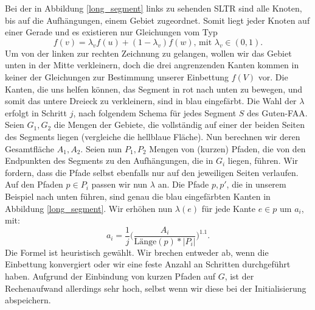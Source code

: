 \begin{example}\label{bsp_long_segment}
Bei der in Abbildung \ref{long_segment} links zu sehenden SLTR sind alle Knoten, bis auf die Aufhängungen, einem Gebiet zugeordnet. Somit liegt jeder Knoten auf einer Gerade und es existieren nur Gleichungen vom Typ
$$ f(v) = \lambda_v f(u) + (1-\lambda_v)f(w) \text{, mit } \lambda_v \in (0,1).$$
Um von der linken zur rechten Zeichnung zu gelangen, wollen wir das Gebiet unten in der Mitte verkleinern, doch die drei angrenzenden Kanten kommen in keiner der Gleichungen zur Bestimmung unserer Einbettung $f(V)$ vor. Die Kanten, die uns helfen können, das Segment in rot nach unten zu bewegen, und somit das untere Dreieck zu verkleinern, sind in blau eingefärbt. Die Wahl der $\lambda$ erfolgt in Schritt $j$, nach folgendem Schema für jedes Segment $S$ des Guten-FAA. Seien $G_1,G_2$ die Mengen der Gebiete, die vollständig auf einer der beiden Seiten des Segments liegen (vergleiche die hellblaue Fläche). Nun berechnen wir deren Gesamtfläche $A_1,A_2$. Seien nun $P_1,P_2$ Mengen von (kurzen) Pfaden, die von den Endpunkten des Segments zu den Aufhängungen, die in $G_i$ liegen, führen. Wir fordern, dass die Pfade selbst ebenfalls nur auf den jeweiligen Seiten verlaufen. Auf den Pfaden $p \in P_i$ passen wir nun $\lambda$ an. Die Pfade $p,p'$, die in unserem Beispiel nach unten führen, sind genau die blau eingefärbten Kanten in Abbildung \ref{long_segment}. Wir erhöhen nun $\lambda(e)$ für jede Kante $e \in p$ um $a_i$, mit:
$$ a_i = \frac{1}{j} \Big( \frac{A_i}{\text{Länge}(p)*|P_i|}\Big)^{1.1}.$$
Die Formel ist heuristisch gewählt. Wir brechen entweder ab, wenn die Einbettung konvergiert oder wir eine feste Anzahl an Schritten durchgeführt haben. Aufgrund der Einbindung von kurzen Pfaden auf $G$, ist der Rechenaufwand allerdings sehr hoch, selbst wenn wir diese bei der Initialisierung abspeichern.
\end{example}

